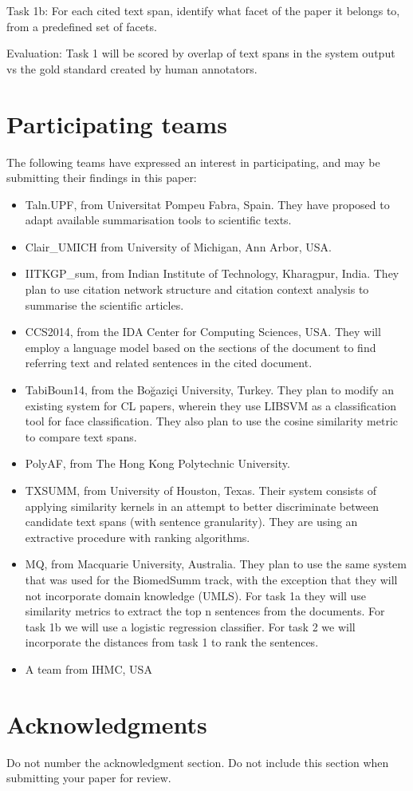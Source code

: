 \documentclass[11pt]{article}
\begin{document}
Task 1b: For each cited text span, identify what facet of the paper it belongs 
to, from a predefined set of facets.

Evaluation: Task 1 will be scored by overlap of text spans in the system output 
vs the gold standard created by human annotators.

\section{Participating teams}
The following teams have expressed an interest in participating, and may be 
submitting their findings in this paper:

\begin{itemize}
\item{Taln.UPF, from Universitat Pompeu Fabra, Spain. They have proposed to 
		adapt available summarisation tools to scientific texts.}
\item{Clair\_UMICH from University of Michigan, Ann Arbor, USA.}
\item{IITKGP\_sum, from Indian Institute of Technology, Kharagpur, India. They 
plan to use citation network structure and citation context analysis to 
summarise the scientific articles.}
\item{CCS2014, from the IDA Center for Computing Sciences, USA. They will 
employ a language model based on the sections of the document to find 
referring text and related sentences in the cited document.}
\item{TabiBoun14, from the Boğaziçi University, Turkey. They plan to modify 
an existing system for CL papers, wherein they use LIBSVM as a classification 
tool for face classification. They also plan to use the cosine similarity 
metric to compare text spans.}
\item{PolyAF, from The Hong Kong Polytechnic University.}
\item{TXSUMM, from University of Houston, Texas. Their system consists of 
applying similarity kernels in an attempt to better discriminate between 
candidate text spans (with sentence granularity). They are using an 
extractive procedure with ranking algorithms.}
\item{MQ, from Macquarie University, Australia. They plan to use the same 
system that was used for the BiomedSumm track, with the exception that they 
will not incorporate domain knowledge (UMLS). For task 1a they will use 
similarity metrics to extract the top n sentences from the documents. For 
task 1b we will use a logistic regression classifier. For task 2 we will 
incorporate the distances from task 1 to rank the sentences.}
\item{A team from IHMC, USA}

\end{itemize}

\section*{Acknowledgments}

Do not number the acknowledgment section. Do not include this section when submitting your paper for review.



\end{document}
